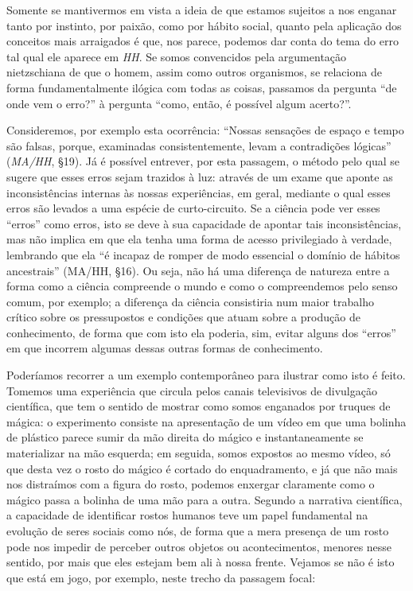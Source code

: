 \documentclass[
	12pt,				%
	openright,			%
	oneside,			%
	a4paper,			%
	english,			%
	french,				%
	spanish,			%
	brazil				%
	]{abntex2}
\begin{document}
Somente se mantivermos em vista a ideia de que estamos sujeitos a nos enganar tanto por instinto, por paixão, como por hábito social, quanto pela aplicação dos conceitos mais arraigados é que, nos parece, podemos dar conta do tema do erro tal qual ele aparece em \textit{HH}. Se somos convencidos pela argumentação nietzschiana de que o homem, assim como outros organismos, se relaciona de forma fundamentalmente ilógica com todas as coisas, passamos da pergunta “de onde vem o erro?” à pergunta “como, então, é possível algum acerto?”. 

	Consideremos, por exemplo esta ocorrência: “Nossas sensações de espaço e tempo são falsas, porque, examinadas consistentemente, levam a contradições lógicas” (\textit{MA/HH}, §19). Já é possível entrever, por esta passagem, o método pelo qual se sugere que esses erros sejam trazidos à luz: através de um exame que aponte as inconsistências internas às nossas experiências, em geral, mediante o qual esses erros são levados a uma espécie de curto-circuito. Se a ciência pode ver esses “erros” como erros, isto se deve à sua capacidade de apontar tais inconsistências, mas não implica em que ela tenha uma forma de acesso privilegiado à verdade, lembrando que ela “é incapaz de romper de modo essencial o domínio de hábitos ancestrais” (MA/HH, §16). Ou seja, não há uma diferença de natureza entre a forma como a ciência compreende o mundo e como o compreendemos pelo senso comum, por exemplo; a diferença da ciência consistiria num maior trabalho crítico sobre os pressupostos e condições que atuam sobre a produção de conhecimento, de forma que com isto ela poderia, sim, evitar alguns dos “erros” em que incorrem algumas dessas outras formas de conhecimento.
	
Poderíamos recorrer a um exemplo contemporâneo para ilustrar como isto é feito. Tomemos uma experiência que circula pelos canais televisivos de divulgação científica, que tem o sentido de mostrar como somos enganados por truques de mágica: o experimento consiste na apresentação de um vídeo em que uma bolinha de plástico parece sumir da mão direita do mágico e instantaneamente se materializar na mão esquerda; em seguida, somos expostos ao mesmo vídeo, só que desta vez o rosto do mágico é cortado do enquadramento, e já que não mais nos distraímos com a figura do rosto, podemos enxergar claramente como o mágico passa a bolinha de uma mão para a outra. Segundo a narrativa científica, a capacidade de identificar rostos humanos teve um papel fundamental na evolução de seres sociais como nós, de forma que a mera presença de um rosto pode nos impedir de perceber outros objetos ou acontecimentos, menores nesse sentido, por mais que eles estejam bem ali à nossa frente. Vejamos se não é isto que está em jogo, por exemplo, neste trecho da passagem focal:
\end{document}
